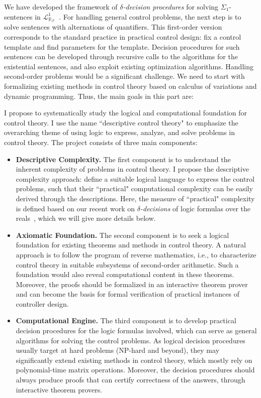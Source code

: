 \documentclass[10pt]{article}
\newcommand{\lrf}{\mathcal{L}_{\mathbb{R}_{\mathcal{F}}}}
\theoremstyle{definition}
\begin{document}
We have developed the framework of {\em $\delta$-decision procedures} for solving $\Sigma_1$-sentences in $\lrf^1$~\cite{DBLP:conf/cade/GaoAC12}. For handling general control problems, the next step is to solve sentences with alternations of quantifiers. This first-order version corresponds to the standard practice in practical control design: fix a control template and find parameters for the template. Decision procedures for such sentences can be developed through recursive calls to the algorithms for the existential sentences, and also exploit existing optimization algorithms. Handling second-order problems would be a significant challenge. We need to start with formalizing existing methods in control theory based on calculus of variations and dynamic programming. Thus, the main goals in this part are:

I propose to systematically study the logical and computational foundation for control theory. I use the name ``descriptive control theory" to emphasize the overarching theme of using logic to express, analyze, and solve problems in control theory. The project consists of three main components:
\begin{itemize}
\item {\bf Descriptive Complexity.} The first component is to understand the inherent complexity of problems in control theory. I propose the descriptive complexity approach: define a suitable logical language to express the control problems, such that their ``practical" computational complexity can be easily derived through the descriptions. Here, the measure of ``practical" complexity is defined based on our recent work on {\em $\delta$-decisions} of logic formulas over the reals~\cite{DBLP:conf/lics/GaoAC12,DBLP:conf/cade/GaoAC12}, which we will give more details below. 
\item {\bf Axiomatic Foundation.} The second component is to seek a logical foundation for existing theorems and methods in control theory. A natural approach is to follow the program of reverse mathematics, i.e., to characterize control theory in suitable subsystems of second-order arithmetic. Such a foundation would also reveal computational content in these theorems. Moreover, the proofs should be formalized in an interactive theorem prover and can become the basis for formal verification of practical instances of controller design. 
\item {\bf Computational Engine.} The third component is to develop practical decision procedures for the logic formulas involved, which can serve as general algorithms for solving the control problems. As logical decision procedures usually target at hard problems (NP-hard and beyond), they may significantly extend existing methods in control theory, which mostly rely on polynomial-time matrix operations. Moreover, the decision procedures should always produce proofs that can certify correctness of the answers, through interactive theorem provers. 
\end{itemize}
\end{document}
